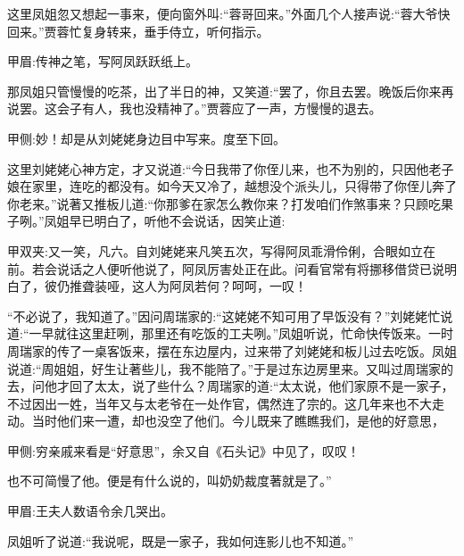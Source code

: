 \begin{parag}
    这里凤姐忽又想起一事来，便向窗外叫:“蓉哥回来。”外面几个人接声说:“蓉大爷快回来。”贾蓉忙复身转来，垂手侍立，听何指示。\begin{note}甲眉:传神之笔，写阿凤跃跃纸上。\end{note}那凤姐只管慢慢的吃茶，出了半日的神，又笑道:“罢了，你且去罢。晚饭后你来再说罢。这会子有人，我也没精神了。”贾蓉应了一声，方慢慢的退去。\begin{note}甲侧:妙！却是从刘姥姥身边目中写来。度至下回。\end{note}
\end{parag}


\begin{parag}
    这里刘姥姥心神方定，才又说道:“今日我带了你侄儿来，也不为别的，只因他老子娘在家里，连吃的都没有。如今天又冷了，越想没个派头儿，只得带了你侄儿奔了你老来。”说著又推板儿道:“你那爹在家怎么教你来？打发咱们作煞事来？只顾吃果子咧。”凤姐早已明白了，听他不会说话，因笑止道:\begin{note}甲双夹:又一笑，凡六。自刘姥姥来凡笑五次，写得阿凤乖滑伶俐，合眼如立在前。若会说话之人便听他说了，阿凤厉害处正在此。问看官常有将挪移借贷已说明白了，彼仍推聋装哑，这人为阿凤若何？呵呵，一叹！\end{note}“不必说了，我知道了。”因问周瑞家的:“这姥姥不知可用了早饭没有？”刘姥姥忙说道:“一早就往这里赶咧，那里还有吃饭的工夫咧。”凤姐听说，忙命快传饭来。一时周瑞家的传了一桌客饭来，摆在东边屋内，过来带了刘姥姥和板儿过去吃饭。凤姐说道:“周姐姐，好生让著些儿，我不能陪了。”于是过东边房里来。又叫过周瑞家的去，问他才回了太太，说了些什么？周瑞家的道:“太太说，他们家原不是一家子，不过因出一姓，当年又与太老爷在一处作官，偶然连了宗的。这几年来也不大走动。当时他们来一遭，却也没空了他们。今儿既来了瞧瞧我们，是他的好意思，\begin{note}甲侧:穷亲戚来看是“好意思”，余又自《石头记》中见了，叹叹！\end{note}也不可简慢了他。便是有什么说的，叫奶奶裁度著就是了。”\begin{note}甲眉:王夫人数语令余几哭出。\end{note}凤姐听了说道:“我说呢，既是一家子，我如何连影儿也不知道。”
\end{parag}


